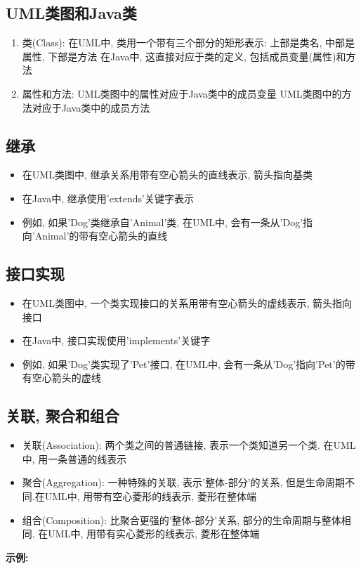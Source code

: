 \documentclass{article}
\begin{document}
\subsection{ UML类图和Java类}
\begin{enumerate}
    \item 类(Class):
    \subitem 在UML中, 类用一个带有三个部分的矩形表示: 上部是类名, 中部是属性, 下部是方法
    \subitem 在Java中, 这直接对应于类的定义, 包括成员变量(属性)和方法
    \item 属性和方法: 
    \subitem UML类图中的属性对应于Java类中的成员变量
    \subitem UML类图中的方法对应于Java类中的成员方法
\end{enumerate}
\subsection{ 继承}
\begin{itemize}
    \item 在UML类图中, 继承关系用带有空心箭头的直线表示, 箭头指向基类
    \item 在Java中, 继承使用'extends'关键字表示
    \item 例如, 如果'Dog'类继承自'Animal'类, 在UML中, 会有一条从'Dog'指向'Animal'的带有空心箭头的直线
\end{itemize}
\subsection{ 接口实现}
\begin{itemize}
    \item 在UML类图中, 一个类实现接口的关系用带有空心箭头的虚线表示, 箭头指向接口
    \item 在Java中, 接口实现使用'implements'关键字
    \item 例如, 如果'Dog'类实现了'Pet'接口, 在UML中, 会有一条从'Dog'指向'Pet'的带有空心箭头的虚线
\end{itemize}
\subsection{ 关联, 聚合和组合}
\begin{itemize}
    \item 关联(Association): 两个类之间的普通链接, 表示一个类知道另一个类. 在UML中, 用一条普通的线表示
    \item 聚合(Aggregation): 一种特殊的关联, 表示'整体-部分'的关系, 但是生命周期不同.在UML中, 用带有空心菱形的线表示, 菱形在整体端
    \item 组合(Composition): 比聚合更强的'整体-部分'关系, 部分的生命周期与整体相同. 在UML中, 用带有实心菱形的线表示, 菱形在整体端
\end{itemize}
\textbf{示例:}
\end{document}
